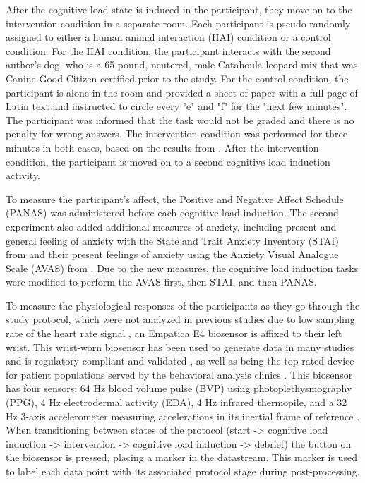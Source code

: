 \documentclass[12pt]{iopart}
\begin{document}
After the cognitive load state is induced in the participant, they move on to the intervention condition in a separate room.  Each participant is pseudo randomly assigned to either a human animal interaction (HAI) condition or a control condition.  For the HAI condition, the participant interacts with the second author's dog, who is a 65-pound, neutered, male Catahoula leopard mix that was Canine Good Citizen certified prior to the study.  For the control condition, the participant is alone in the room and provided a sheet of paper with a full page of Latin text and instructed to circle every "e" and "f" for the "next few minutes".  The participant was informed that the task would not be graded and there is no penalty for wrong answers.  The intervention condition was performed for three minutes in both cases, based on the results from \cite{handlin2011short}.  After the intervention condition, the participant is moved on to a second cognitive load induction activity.

To measure the participant's affect, the Positive and Negative Affect Schedule (PANAS)\cite{watson1988development} was administered before each cognitive load induction.  The second experiment also added additional measures of anxiety, including present and general feeling of anxiety with the State and Trait Anxiety Inventory (STAI) from \cite{spielberger1999measuring} and their present feelings of anxiety using the Anxiety Visual Analogue Scale (AVAS) from \cite{cella1986reliability}.  Due to the new measures, the cognitive load induction tasks were modified to perform the AVAS first, then STAI, and then PANAS.

To measure the physiological responses of the participants as they go through the study protocol, which were not analyzed in previous studies due to low sampling rate of the heart rate signal \cite{shaffer2017overview, thayer2022effects, Stevens2020EffectsOH}, an Empatica E4 biosensor is affixed to their left wrist.  This wrist-worn biosensor has been used to generate data in many studies \cite{goodwin2019predicting, thayer2022effects, schmidt2018introducing} and is regulatory compliant and validated \cite{poh2010wearable}, as well as being the top rated device for patient populations served by the behavioral analysis clinics \cite{taj2018review}.  This biosensor has four sensors: 64 Hz blood volume pulse (BVP) using photoplethysmography (PPG), 4 Hz electrodermal activity (EDA), 4 Hz infrared thermopile, and a 32 Hz 3-axis accelerometer measuring accelerations in its inertial frame of reference \cite{goodwin2019predicting}.  When transitioning between states of the protocol (start -> cognitive load induction -> intervention -> cognitive load induction -> debrief) the button on the biosensor is pressed, placing a marker in the datastream.  This marker is used to label each data point with its associated protocol stage during post-processing.
\end{document}
